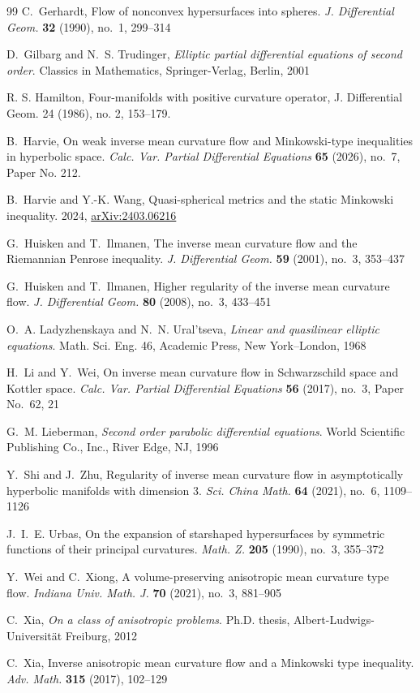 \documentclass[11pt,reqno]{amsart}
\providecommand{\arxiv}[1]{\href{https://arxiv.org/abs/#1}{arXiv:#1}}
\theoremstyle{definition}
\theoremstyle{remark}
\numberwithin{equation}{section}
\begin{document}
\begin{thebibliography}{99}
C.~Gerhardt, Flow of nonconvex hypersurfaces into spheres.
\emph{J. Differential Geom.} \textbf{32} (1990), no.~1, 299--314

D.~Gilbarg and N.~S. Trudinger, \emph{Elliptic partial differential equations of second order}.
Classics in Mathematics, Springer-Verlag, Berlin, 2001

R. S. Hamilton, Four-manifolds with positive curvature operator, J. Differential Geom. 24 (1986), no. 2, 153--179.

B.~Harvie, On weak inverse mean curvature flow and Minkowski-type inequalities in hyperbolic space. 
\emph{Calc. Var. Partial Differential Equations} \textbf{65} (2026), no.~7, Paper No. 212. 

B.~Harvie and Y.-K. Wang, Quasi-spherical metrics and the static Minkowski inequality.
2024, \arxiv{2403.06216}

G.~Huisken and T.~Ilmanen, The inverse mean curvature flow and the Riemannian Penrose inequality.
\emph{J. Differential Geom.} \textbf{59} (2001), no.~3, 353--437

G.~Huisken and T.~Ilmanen, Higher regularity of the inverse mean curvature flow.
\emph{J. Differential Geom.} \textbf{80} (2008), no.~3, 433--451

O.~A. Ladyzhenskaya and N.~N. Ural'tseva, \emph{Linear and quasilinear elliptic equations}.
Math. Sci. Eng. 46, Academic Press, New York--London, 1968

H.~Li and Y.~Wei, On inverse mean curvature flow in Schwarzschild space and Kottler space.
\emph{Calc. Var. Partial Differential Equations} \textbf{56} (2017), no.~3, Paper No.~62, 21

G.~M. Lieberman, \emph{Second order parabolic differential equations}.
World Scientific Publishing Co., Inc., River Edge, NJ, 1996

Y.~Shi and J.~Zhu, Regularity of inverse mean curvature flow in asymptotically hyperbolic manifolds with dimension 3.
\emph{Sci. China Math.} \textbf{64} (2021), no.~6, 1109--1126

J.~I.~E. Urbas, On the expansion of starshaped hypersurfaces by symmetric functions of their principal curvatures.
\emph{Math. Z.} \textbf{205} (1990), no.~3, 355--372

Y.~Wei and C.~Xiong, A volume-preserving anisotropic mean curvature type flow.
\emph{Indiana Univ. Math. J.} \textbf{70} (2021), no.~3, 881--905

C.~Xia, \emph{On a class of anisotropic problems}.
Ph.D. thesis, Albert-Ludwigs-Universit\"at Freiburg, 2012

C.~Xia, Inverse anisotropic mean curvature flow and a Minkowski type inequality.
\emph{Adv. Math.} \textbf{315} (2017), 102--129

\end{thebibliography}
\end{document}
